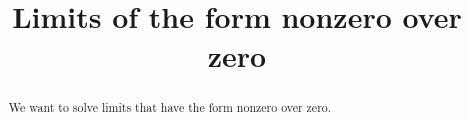 \documentclass{ximera}
\title{Limits of the form nonzero over zero}
\begin{document}
\begin{abstract}
  We want to solve limits that have the form nonzero over zero.
\end{abstract}

\maketitle

\end{document}
